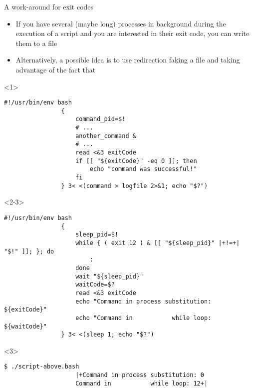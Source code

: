 \begin{frame}[fragile]{A work-around for exit codes}
    \vspace{-1mm}
    \begin{overlayarea}{\textwidth}{\textheight}
        \begin{itemize}
            \item If you have several (maybe long) processes in background during the execution of a script and you are interested in their exit code, you can write them to a file
            \item Alternatively, a possible idea is to use redirection faking a file and taking advantage of the fact that 
        \end{itemize}
        \begin{onlyenv}<1>
            \begin{lstlisting}[style=MyBash, aboveskip=3mm, emph={[7]command_pid, exitCode}, emph={[8]another_command}]
                #!/usr/bin/env bash
                {
                    command_pid=$!
                    # ...
                    another_command &
                    # ...
                    read <&3 exitCode
                    if [[ "${exitCode}" -eq 0 ]]; then
                        echo "command was successful!"
                    fi
                } 3< <(command > logfile 2>&1; echo "$?")
            \end{lstlisting}
        \end{onlyenv}
        \begin{onlyenv}<2-3>
            \begin{lstlisting}[style=MyBash, aboveskip=3mm, emph={[7]sleep_pid, exitCode, waitCode}, firstnumber=12, xrightmargin=2mm]
                #!/usr/bin/env bash
                {
                    sleep_pid=$!
                    while { ( exit 12 ) & [[ "${sleep_pid}" |+!=+| "$!" ]]; }; do
                        :
                    done
                    wait "${sleep_pid}"
                    waitCode=$?
                    read <&3 exitCode
                    echo "Command in process substitution: ${exitCode}"
                    echo "Command in           while loop: ${waitCode}"
                } 3< <(sleep 1; echo "$?")
            \end{lstlisting}
            \begin{uncoverenv}<3>
                \begin{lstlisting}[style=MyBash, numbers=none, aboveskip=1mm, xrightmargin=2mm]
                    $ ./script-above.bash
                    |+Command in process substitution: 0
                    Command in           while loop: 12+|
                \end{lstlisting}
            \end{uncoverenv}
        \end{onlyenv}
    \end{overlayarea}
\end{frame}
